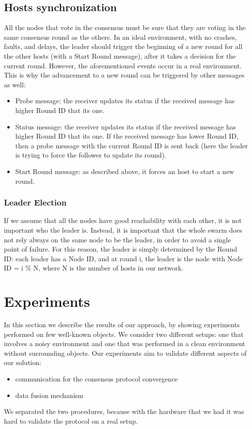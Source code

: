 \documentclass[10pt,conference,compsocconf]{IEEEtran}
\begin{document}
\subsection{Hosts synchronization}All the nodes that vote in the consensus must be sure that they are voting in the same consensus round as the others. In an ideal environment, with no crashes, faults, and delays, the leader should trigger the beginning of a new round for all the other hosts (with a Start Round message), after it takes a decision for the current round. However, the aforementioned events occur in a real environment. This is why the advancement to a new round can be triggered by other messages as well:
\begin{itemize}
\item Probe message: the receiver updates its status if the received message has higher Round ID that its one.
\item Status message: the receiver updates its status if the received message has higher Round ID that its one. If the received message has lower Round ID, then a probe message with the current Round ID is sent back (here the leader is trying to force the follower to update its round).
\item Start Round message: as described above, it forces an host to start a new round.
\end{itemize}
\subsubsection{Leader Election}
If we assume that all the nodes have good reachability with each other, it is not important who the leader is. Instead, it is important that the whole swarm does not rely always on the same node to be the leader, in order to avoid a single point of failure. For this reason, the leader is simply determined by the Round ID: each leader has a Node ID, and at round i, the leader is the node with Node ID = i \% N, where N is the number of hosts in our network.
\section{Experiments}
In this section we describe the results of our approach, by showing experiments performed on few well-known objects. We consider two different setups: one that involves a noisy environment and one that was performed in a clean environment without surrounding objects.
Our experiments aim to validate different aspects of our solution:
\begin{itemize}
\item communication for the consensus protocol convergence
\item data fusion mechanism
\end{itemize}
We separated the two procedures, because with the hardware that we had it was hard to validate the protocol on a real setup.
\end{document}

